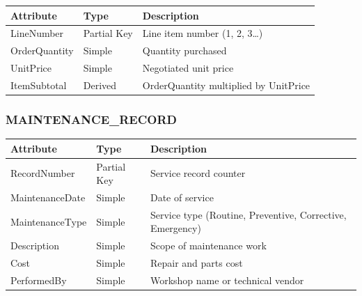 \documentclass[a4paper,12pt]{report}
\newcounter{none} %
\begin{document}
{\def\LTcaptype{none} %
\begin{longtable}[]{@{}
  >{\raggedright\arraybackslash}p{}
  >{\raggedright\arraybackslash}p{}
  >{\raggedright\arraybackslash}p{}@{}}
\toprule\noalign{}
\begin{minipage}[b]{\linewidth}\raggedright
Attribute
\end{minipage} & \begin{minipage}[b]{\linewidth}\raggedright
Type
\end{minipage} & \begin{minipage}[b]{\linewidth}\raggedright
Description
\end{minipage} \\
\midrule\noalign{}
\endhead
\bottomrule\noalign{}
\endlastfoot
LineNumber & Partial Key & Line item number (\allowbreak{}1, 2, 3\ldots) \\
OrderQuantity & Simple & Quantity purchased \\
UnitPrice & Simple & Negotiated unit price \\
ItemSubtotal & Derived & OrderQuantity multiplied by UnitPrice \\
\end{longtable}
}

\subsubsection{\texorpdfstring{MAINTENANCE\texorpdfstring{\_\allowbreak{}}{_}RECORD}{MAINTENANCERECORD}}\label{maintenance_record}

{\def\LTcaptype{none} %
\begin{longtable}[]{@{}
  >{\raggedright\arraybackslash}p{}
  >{\raggedright\arraybackslash}p{}
  >{\raggedright\arraybackslash}p{}@{}}
\toprule\noalign{}
\begin{minipage}[b]{\linewidth}\raggedright
Attribute
\end{minipage} & \begin{minipage}[b]{\linewidth}\raggedright
Type
\end{minipage} & \begin{minipage}[b]{\linewidth}\raggedright
Description
\end{minipage} \\
\midrule\noalign{}
\endhead
\bottomrule\noalign{}
\endlastfoot
RecordNumber & Partial Key & Service record counter \\
MaintenanceDate & Simple & Date of service \\
MaintenanceType & Simple & Service type (\allowbreak{}Routine, Preventive, Corrective, Emergency) \\
Description & Simple & Scope of maintenance work \\
Cost & Simple & Repair and parts cost \\
PerformedBy & Simple & Workshop name or technical vendor \\
\end{longtable}
}
\end{document}
